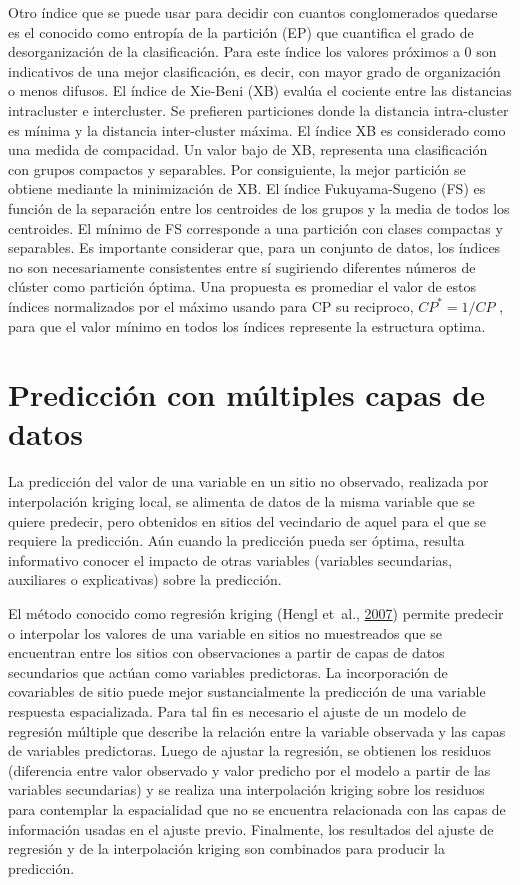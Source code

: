 \documentclass[11pt,b5paper,]{krantz}
\begin{document}
Otro índice que se puede usar para decidir con cuantos conglomerados
quedarse es el conocido como entropía de la partición (EP) que
cuantifica el grado de desorganización de la clasificación. Para este
índice los valores próximos a 0 son indicativos de una mejor
clasificación, es decir, con mayor grado de organización o menos
difusos. El índice de Xie-Beni (XB) evalúa el cociente entre las
distancias intracluster e intercluster. Se prefieren particiones donde
la distancia intra-cluster es mínima y la distancia inter-cluster
máxima. El índice XB es considerado como una medida de compacidad. Un
valor bajo de XB, representa una clasificación con grupos compactos y
separables. Por consiguiente, la mejor partición se obtiene mediante la
minimización de XB. El índice Fukuyama-Sugeno (FS) es función de la
separación entre los centroides de los grupos y la media de todos los
centroides. El mínimo de FS corresponde a una partición con clases
compactas y separables. Es importante considerar que, para un conjunto
de datos, los índices no son necesariamente consistentes entre sí
sugiriendo diferentes números de clúster como partición óptima. Una
propuesta es promediar el valor de estos índices normalizados por el
máximo usando para CP su reciproco, \(CP^*=1/CP\) , para que el valor
mínimo en todos los índices represente la estructura optima.

\chapter{Predicción con múltiples capas de
datos}\label{predicciuxf3n-con-muxfaltiples-capas-de-datos}

La predicción del valor de una variable en un sitio no observado,
realizada por interpolación kriging local, se alimenta de datos de la
misma variable que se quiere predecir, pero obtenidos en sitios del
vecindario de aquel para el que se requiere la predicción. Aún cuando la
predicción pueda ser óptima, resulta informativo conocer el impacto de
otras variables (variables secundarias, auxiliares o explicativas) sobre
la predicción.

El método conocido como regresión kriging (Hengl et~al.,
\protect\hyperlink{ref-Hengl_Heuvelink_Rossiter_2007}{2007}) permite
predecir o interpolar los valores de una variable en sitios no
muestreados que se encuentran entre los sitios con observaciones a
partir de capas de datos secundarios que actúan como variables
predictoras. La incorporación de covariables de sitio puede mejor
sustancialmente la predicción de una variable respuesta espacializada.
Para tal fin es necesario el ajuste de un modelo de regresión múltiple
que describe la relación entre la variable observada y las capas de
variables predictoras. Luego de ajustar la regresión, se obtienen los
residuos (diferencia entre valor observado y valor predicho por el
modelo a partir de las variables secundarias) y se realiza una
interpolación kriging sobre los residuos para contemplar la espacialidad
que no se encuentra relacionada con las capas de información usadas en
el ajuste previo. Finalmente, los resultados del ajuste de regresión y
de la interpolación kriging son combinados para producir la predicción.
\end{document}
